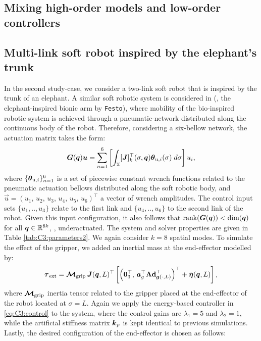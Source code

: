 \begin{figure}[!t]
  \centering
  
  \caption{}
\end{figure}

\subsection{Mixing high-order models and low-order controllers}


\clearpage

\subsection{Multi-link soft robot inspired by the elephant's trunk}
In the second study-case, we consider a two-link soft robot that is inspired by the trunk of an elephant. A similar soft robotic system is considered in \cite{Falkenhahn2015} (\ie, the elephant-inspired bionic arm by \texttt{Festo}), where mobility of the bio-inspired robotic system is achieved through a pneumatic-network distributed along the continuous body of the robot. Therefore, considering a six-bellow network, the actuation matrix takes the form:
%
\begin{equation*}
\boldsymbol{G}(\boldsymbol{q})\boldsymbol{u} = \sum_{n=1}^6 \left[ \int_{\mathbb{X}} [\boldsymbol{J}]_k^\top(\sigma,\boldsymbol{q}) {\boldsymbol{\theta}}_{\textrm{u},i}(\sigma)\; d\sigma\right] u_i,
\end{equation*}
%
where $\{{\boldsymbol{\theta}}_{\textrm{u},i}\}_{n=1}^6$ is a set of piecewise constant wrench functions related to the pneumatic actuation bellows distributed along the soft robotic body, and $\vec{u} = (u_1,\,u_2,\,u_3,\,u_4,\,u_5,\,u_6)^\top$ a vector of wrench amplitudes. The control input sets $\{u_1,..,u_3\}$ relate to the first link and $\{u_4,..,u_6\}$ to the second link of the robot. Given this input configuration, it also follows that $\textnormal{rank}(\boldsymbol{G}(\boldsymbol{q})) < \text{dim}(\boldsymbol{q})$ for all $\boldsymbol{q} \in \mathbb{R}^{6k}$, \ie, underactuated. The system and solver properties are given in Table \ref{tab:C3:parameters2}. We again consider $k=8$ spatial modes. To simulate the effect of the gripper, we added an inertial mass at the end-effector modelled by:
%
$$\boldsymbol{\tau}_{\textrm{ext}} =  \boldsymbol{\mathcal{M}}_{\textrm{grip}}\,{\boldsymbol{J}}({\boldsymbol{q}},L)^\top \left[ \left(\boldsymbol{0}_3^\top,\, {\boldsymbol{a}}_g ^\top \textbf{Ad}^\top_{{\boldsymbol{g}}(\cdot,L)} \right)^\top + \dot{{\boldsymbol{\eta}}}({\boldsymbol{q}},L) \right],$$
%
where $\boldsymbol{\mathcal{M}}_{\textrm{grip}}$ inertia tensor related to the gripper placed at the end-effector of the robot located at $\sigma = L$. Again we apply the energy-based controller in \eqref{eq:C3:control} to the system, where the control gains are $\lambda_1 = 5$ and $\lambda_2 = 1$, while the artificial stiffness matrix $\boldsymbol{k}_p$ is kept identical to previous simulations. Lastly, the desired configuration of the end-effector is chosen as follows:
